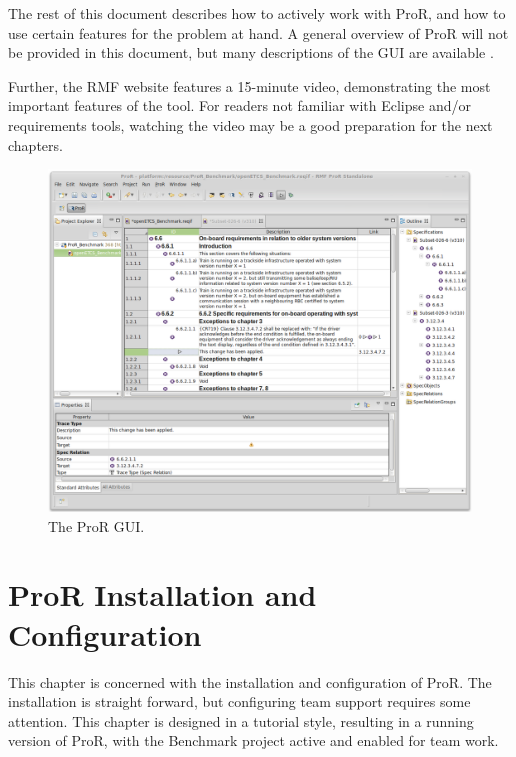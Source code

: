\documentclass{template/openetcs_report}
\begin{document}
The rest of this document describes how to actively work with ProR, and how to use certain features for the problem at hand.  A general overview of ProR will not be provided in this document, but many descriptions of the GUI are available \cite{RMF_Mark_Book_Jastram_2013, reqif_ObjektSpektrum_2013}.  

Further, the RMF website \cite{RMF} features a 15-minute video, demonstrating the most important features of the tool.  For readers not familiar with Eclipse and/or requirements tools, watching the video may be a good preparation for the next chapters.

\begin{figure}[h!]
	\begin{center}
	\includegraphics[width=\textwidth]{img/pror.png}
	\end{center}
	\caption{The ProR GUI.}
	\label{fig:pror}
\end{figure} 

\chapter{ProR Installation and Configuration}

This chapter is concerned with the installation and configuration of ProR.  The installation is straight forward, but configuring team support requires some attention.  This chapter is designed in a tutorial style, resulting in a running version of ProR, with the Benchmark project active and enabled for team work.
\end{document}

